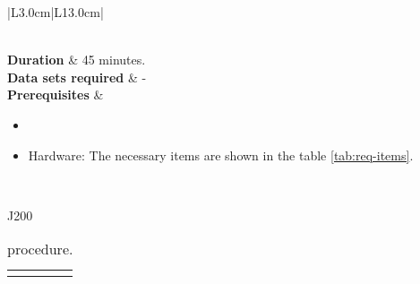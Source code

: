 \begin{table}[H]
\begin{tabular}{|L{3.0cm}|L{13.0cm}|}
\begin{minipage}[t]{\linewidth}
		\end{minipage}
		\\\hline
		\textbf{Duration} & 45 minutes.\\\hline	
		\textbf{Data sets required} & -\\\hline
		\textbf{Prerequisites} & 
		\begin{minipage}[t]{\linewidth}
			\begin{itemize}[nosep,after=\strut]
				\item \preReqPro
				\item Hardware: The necessary items are shown in the table \ref{tab:req-items}.
			\end{itemize} 
		\end{minipage}\\\hline
	\end{tabular}
	\caption{Procedure \subprocid{} \ description. } \label{tb:\subprocid{}}
\end{table}

\setcounter{Sec}{0}\setcounter{Step}{0}
\report{}{}{}
\begin{stepstable}{\subprocid{} \procname{}}
	\ExecutorRecord{}
		\StopCegseSW{}
		\DisablePowerSupplyOutput
		\TurnOffMainSwitch
		\PowerOffPxi


			{J200}{\notskip{}}

	
		\GetTempAndHumidityFromDatalogger

\end{stepstable}
\begin{longtable}{|p{17.0cm}|}
	\endfirsthead
	\endfoot
	\caption{\subprocid{} procedure.}
\end{longtable}


